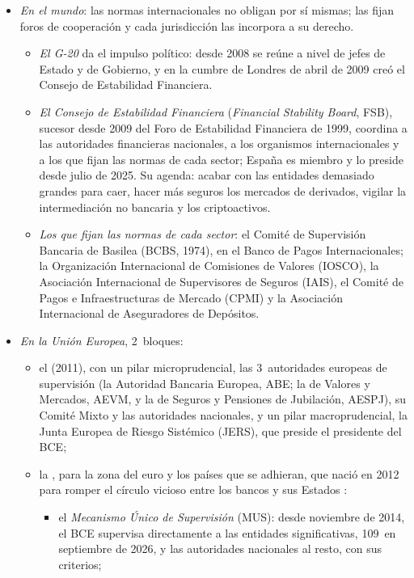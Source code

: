 \documentclass[11pt]{article}
\begin{document}
\begin{itemize}
\item \emph{En el mundo}: las normas internacionales no obligan por sí mismas; las fijan foros de cooperación y cada jurisdicción las incorpora a su derecho.
  \begin{itemize}
  \item \emph{El G-20} da el impulso político: desde 2008 se reúne a nivel de jefes de Estado y de Gobierno, y en la cumbre de Londres de abril de 2009 creó el Consejo de Estabilidad Financiera\nocite{G20Londres2009}.
  \item \emph{El Consejo de Estabilidad Financiera} (\emph{Financial Stability Board}, FSB), sucesor desde 2009 del Foro de Estabilidad Financiera de 1999, coordina a las autoridades financieras nacionales, a los organismos internacionales y a los que fijan las normas de cada sector; España es miembro y lo preside  desde julio de 2025\nocite{FSB2026Historia,FSB2026Miembros}. Su agenda: acabar con las entidades demasiado grandes para caer, hacer más seguros los mercados de derivados, vigilar la intermediación no bancaria y los criptoactivos.
  \item \emph{Los que fijan las normas de cada sector}: el Comité de Supervisión Bancaria de Basilea (BCBS, 1974), en el Banco de Pagos Internacionales; la Organización Internacional de Comisiones de Valores (IOSCO), la Asociación Internacional de Supervisores de Seguros (IAIS), el Comité de Pagos e Infraestructuras de Mercado (CPMI) y la Asociación Internacional de Aseguradores de Depósitos.
  \end{itemize}
\item \emph{En la Unión Europea}, 2~bloques:
  \begin{itemize}
  \item el  (2011), con un pilar microprudencial, las 3~autoridades europeas de supervisión (la Autoridad Bancaria Europea, ABE; la de Valores y Mercados, AEVM, y la de Seguros y Pensiones de Jubilación, AESPJ), su Comité Mixto y las autoridades nacionales, y un pilar macroprudencial, la Junta Europea de Riesgo Sistémico (JERS), que preside el presidente del BCE;
  \item la , para la zona del euro y los países que se adhieran, que nació en 2012 para romper el círculo vicioso entre los bancos y sus Estados :
    \begin{itemize}
    \item el \emph{Mecanismo Único de Supervisión} (MUS): desde noviembre de 2014, el BCE supervisa directamente a las entidades significativas, 109~en septiembre de 2026, y las autoridades nacionales al resto, con sus criterios\nocite{RegUE2013MUS,BCE2026MUSEntidades};

\end{itemize}
\end{itemize}
\end{itemize}
\end{document}
